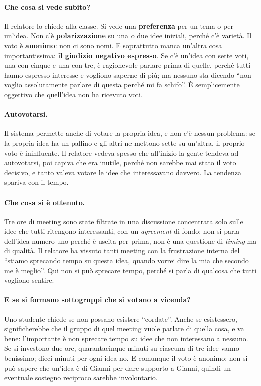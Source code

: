 \paragraph{Che cosa si vede subito?} Il relatore lo chiede alla classe. Si vede una
\textbf{preferenza} per un tema o per un'idea. Non c'è \textbf{polarizzazione} su una
o due idee iniziali, perché c'è varietà. Il voto è \textbf{anonimo}: non ci sono nomi.
E soprattutto manca un'altra cosa importantissima: \textbf{il giudizio negativo
espresso}. Se c'è un'idea con sette voti, una con cinque e una con tre, è
ragionevole parlare prima di quelle, perché tutti hanno espresso interesse e vogliono
saperne di più; ma nessuno sta dicendo ``non voglio assolutamente parlare di questa
perché mi fa schifo''. È semplicemente oggettivo che quell'idea non ha ricevuto voti.

\paragraph{Autovotarsi.} Il sistema permette anche di votare la propria idea, e non c'è
nessun problema: se la propria idea ha un pallino e gli altri ne mettono sette su
un'altra, il proprio voto è ininfluente. Il relatore vedeva spesso che all'inizio la
gente tendeva ad autovotarsi, poi capiva che era inutile, perché non sarebbe mai stato
il voto decisivo, e tanto valeva votare le idee che interessavano davvero. La
tendenza spariva con il tempo.

\paragraph{Che cosa si è ottenuto.} Tre ore di meeting sono state filtrate in una
discussione concentrata solo sulle idee che tutti ritengono interessanti, con un
\emph{agreement} di fondo: non si parla dell'idea numero uno perché è uscita per prima,
non è una questione di \emph{timing} ma di qualità. Il relatore ha vissuto tanti
meeting con la frustrazione interna del ``stiamo sprecando tempo su questa idea,
quando vorrei dire la mia che secondo me è meglio''. Qui non si può sprecare tempo,
perché si parla di qualcosa che tutti vogliono sentire.

\paragraph{E se si formano sottogruppi che si votano a vicenda?} Uno studente chiede se
non possano esistere ``cordate''. Anche se esistessero, significherebbe che il gruppo di
quel meeting vuole parlare di quella cosa, e va bene: l'importante è non sprecare tempo
su idee che non interessano a nessuno. Se si investono due ore, quarantacinque minuti
su ciascuna di tre idee vanno benissimo; dieci minuti per ogni idea no. E comunque il
voto è anonimo: non si può sapere che un'idea è di Gianni per dare supporto a Gianni,
quindi un eventuale sostegno reciproco sarebbe involontario.

